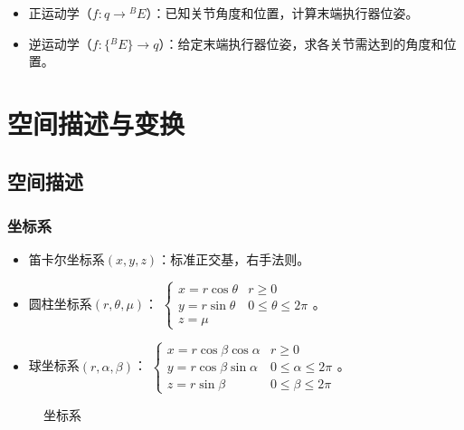 \documentclass[
12pt, %
a4paper, 
oneside, %
headinclude,footinclude, %
]{scrartcl}
\begin{document}
\begin{itemize}
\item 正运动学（$ f:q \rightarrow {}^B E $）：已知关节角度和位置，计算末端执行器位姿。
\item 逆运动学（$ f:\{{}^B E\} \rightarrow q $）：给定末端执行器位姿，求各关节需达到的角度和位置。
\end{itemize}
\section{空间描述与变换}
\subsection[空间描述]{空间描述}
\subsubsection[坐标系]{坐标系}
\begin{itemize}
\item 笛卡尔坐标系$ (x, y, z) $：标准正交基，右手法则。
\item 圆柱坐标系$ (r, \theta, \mu) $：
$ 
\begin{cases}
x = r \cos\theta &r \geq 0 \\
y = r \sin\theta &0 \leq \theta \leq 2 \pi \\
z = \mu
\end{cases} 
$。
\item 球坐标系$ (r, \alpha, \beta) $：
$ 
\begin{cases}
x = r \cos\beta \cos\alpha &r \geq 0 \\
y = r \cos\beta \sin\alpha &0 \leq \alpha \leq 2\pi \\
z = r \sin\beta &0 \leq \beta \leq 2\pi
\end{cases} 
$。
\end{itemize}

\begin{figure}[H]
\centering
{} \quad
{} \quad
{}
\caption{坐标系}
\end{figure}
\end{document}
